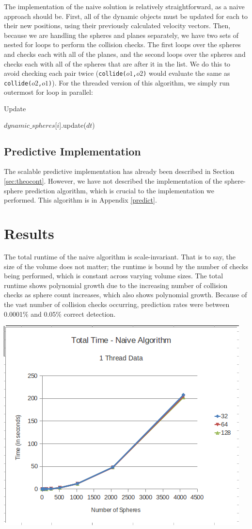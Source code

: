 \documentclass[conference]{IEEEtran}
\begin{document}
The implementation of the naive solution is relatively straightforward, as a naive approach should be.  First, all of the dynamic objects must be updated for each  to their new positions, using their previously calculated velocity vectors.  Then, because we are handling the spheres and planes separately, we have two sets of nested for loops to perform the collision checks.  The first loops over the spheres and checks each with all of the planes, and the second loops over the spheres and checks each with all of the spheres that are after it in the list.  We do this to avoid checking each pair twice (\texttt{collide($o1$,$o2$)} would evaluate the same as \texttt{collide($o2$,$o1$)}). For the threaded version of this algorithm, we simply run outermost for loop in parallel:

\begin{algorithm}
\caption{Update}
\begin{algorithmic}
	\STATE $dynamic\_spheres$[$i$].update($dt$)
\ENDFOR
\end{algorithmic}
\end{algorithm}

\subsection{Predictive Implementation}

The scalable predictive implementation has already been described in Section \ref{sec:theocont}.  However, we have not described the implementation of the sphere-sphere prediction algorithm, which is crucial to the 
implementation we performed.  This algorithm is in Appendix \ref{predict}.

\section{Results} 
\label{results}
The total runtime of the naive algorithm is scale-invariant.  That is to say, the size of the volume does not matter; the runtime is bound by the number of checks being performed, which is constant across varying volume sizes.  The total runtime shows polynomial growth due to the increasing number of collision checks as sphere count increases, which also shows polynomial growth.  Because of the vast number of collision checks occurring, prediction rates were between 0.0001\% and 0.05\% correct detection.

\begin{center}
	\includegraphics[width=.45\textwidth]{runtime_naive_1thread.png}
\end{center}
\end{document}
